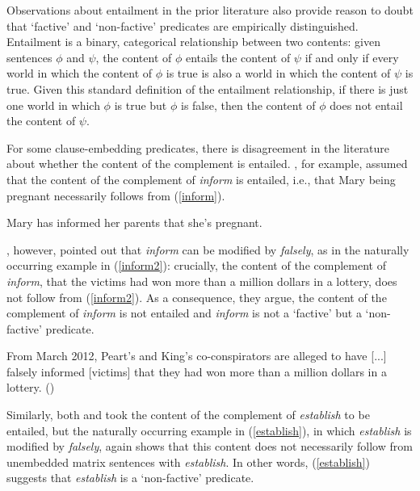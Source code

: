 \documentclass[11pt,fleqn]{article}
\newcommand{\6}{\mbox{$[\hspace*{-.6mm}[$}}
\newcommand{\9}{\mbox{$]\hspace*{-.6mm}]$}}
\begin{document}
Observations about entailment in the prior literature also provide reason to doubt that `factive'  and `non-factive' predicates are empirically distinguished. Entailment is a binary, categorical relationship between two contents: given sentences $\phi$ and $\psi$, the content of $\phi$ entails the content of $\psi$ if and only if every world in which the content of $\phi$ is true is also a world in which the content of $\psi$ is true. Given this standard definition of the entailment relationship, if there is just one world in which $\phi$ is true but $\phi$ is false, then the content of $\phi$ does not entail the content of $\psi$.

For some clause-embedding predicates, there is disagreement in the literature about whether the content of the complement is entailed. \citet[139]{schlenker10}, for example, assumed that the content of the complement of {\em inform} is entailed, i.e., that Mary being pregnant necessarily follows from (\ref{inform}).  

\begin{exe}
\ex\label{inform} Mary has informed her parents that she's pregnant.

\end{exe}
\citet[76]{anand-hacquard2014}, however, pointed out that {\em inform} can be modified by {\em falsely}, as in the naturally occurring example in (\ref{inform2}): crucially, the content of the complement of {\em inform}, that the victims had won more than a million dollars in a lottery, does not follow from (\ref{inform2}). As a consequence, they argue, the content of the complement of {\em inform}  is not entailed and {\em inform} is not a `factive' but a `non-factive' predicate.

\begin{exe}
\ex\label{inform2} From March 2012, Peart's and King's co-conspirators are alleged to have [...] falsely informed [victims] that they had won more than a million dollars in a lottery. \hfill (\citealt[76]{anand-hacquard2014})
\end{exe}
Similarly, both \citet{wyse} and \citet{swanson2012} took the content of the complement of {\em establish} to be entailed, but the naturally occurring example in (\ref{establish}), in which {\em establish} is  modified by {\em falsely}, again shows that this content does not necessarily follow from unembedded matrix sentences with {\em establish}. In other words, (\ref{establish}) suggests that {\em establish} is a `non-factive' predicate.
\end{document}

